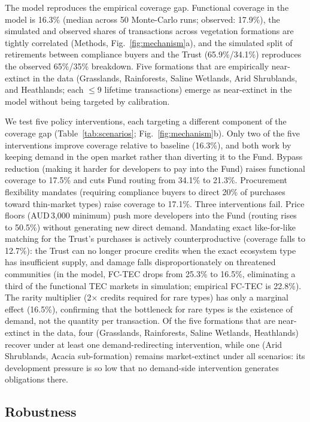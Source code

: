 \documentclass[pdflatex,sn-nature,oneside]{sn-jnl}
\begin{document}
The model reproduces the empirical coverage gap. Functional coverage in
the model is 16.3\% (median across 50 Monte-Carlo runs; observed: 17.9\%),
the simulated and observed shares of transactions across vegetation
formations are tightly correlated (Methods, Fig.~\ref{fig:mechanism}a),
and the simulated split of retirements between compliance buyers and the
Trust (65.9\%/34.1\%) reproduces the observed 65\%/35\% breakdown. Five
formations that are empirically near-extinct in the data (Grasslands,
Rainforests, Saline Wetlands, Arid Shrublands, and Heathlands; each
$\leq$9 lifetime transactions) emerge as near-extinct in the model
without being targeted by calibration.

We test five policy interventions, each targeting a different component
of the coverage gap (Table~\ref{tab:scenarios}; Fig.~\ref{fig:mechanism}b).
Only two of the five interventions improve coverage relative to baseline
(16.3\%), and both work by keeping demand in the open market rather than
diverting it to the Fund. Bypass reduction (making it harder for
developers to pay into the Fund) raises functional coverage to 17.5\%
and cuts Fund routing from 34.1\% to 21.3\%. Procurement flexibility
mandates (requiring compliance buyers to direct 20\% of purchases
toward thin-market types) raise coverage to 17.1\%.
Three interventions fail. Price floors (AUD\,3,000 minimum) push more
developers into the Fund (routing rises to 50.5\%) without generating
new direct demand. Mandating exact like-for-like matching for the
Trust's purchases is actively counterproductive (coverage falls to
12.7\%): the Trust can no longer procure credits when the exact ecosystem
type has insufficient supply, and damage falls disproportionately on
threatened communities (in the model, FC-TEC drops from 25.3\% to 16.5\%,
eliminating a third of the functional TEC markets in simulation;
empirical FC-TEC is 22.8\%). The rarity multiplier (2$\times$ credits required for rare
types) has only a marginal effect (16.5\%), confirming that the
bottleneck for rare types is the existence of demand, not the quantity
per transaction. Of the five formations that are near-extinct in the data,
four (Grasslands, Rainforests, Saline Wetlands, Heathlands) recover under
at least one demand-redirecting intervention, while one (Arid Shrublands,
Acacia sub-formation) remains market-extinct under all scenarios: its
development pressure is so low that no demand-side intervention generates
obligations there.

\subsection*{Robustness}
\end{document}
